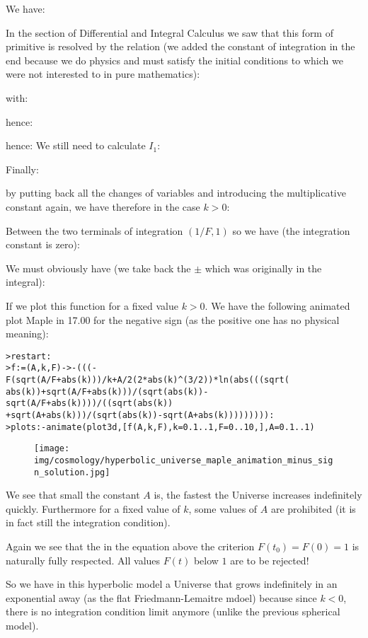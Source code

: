 	We have:
	
	In the section of Differential and Integral Calculus we saw that this form of primitive is resolved by the relation (we added the constant of integration in the end because we do physics and must satisfy the initial conditions to which we were not interested to in pure mathematics):
		
	with:
	
	hence:
	
	hence:
	We still need to calculate $I_1$:
	
	Finally:
	
	by putting back all the changes of variables and introducing the multiplicative constant again, we have therefore in the case $k>0$:
	
	Between the two terminals of integration $(1/F,1)$ so we have (the integration constant is zero):
	
	We must obviously have (we take back the $\pm$ which was originally in the integral):
	
	If we plot this function for a fixed value $k>0$. We have the following  animated plot Maple in 17.00 for the negative sign (as the positive one has no physical meaning):
	
	\texttt{>restart:\\
	>f:=(A,k,F)->-(((-F(sqrt(A/F+abs(k)))/k+A/2(2*abs(k)\string^(3/2))*ln(abs(((sqrt(\\
	abs(k))+sqrt(A/F+abs(k)))/(sqrt(abs(k))-sqrt(A/F+abs(k))))/((sqrt(abs(k))\\
	+sqrt(A+abs(k)))/(sqrt(abs(k))-sqrt(A+abs(k))))))))):\\
	>plots:-animate(plot3d,[f(A,k,F),k=0.1..1,F=0..10,],A=0.1..1)
	}
	\begin{figure}[H]
		\begin{center}
		\texttt{[image: img/cosmology/hyperbolic\_universe\_maple\_animation\_minus\_sign\_solution.jpg]}
		\end{center}
	\end{figure}
	We see that small the constant $A$ is, the fastest the Universe increases indefinitely quickly. Furthermore for a fixed value of $k$, some values of $A$ are prohibited (it is in fact still the integration condition).

	Again we see that the in the equation above the criterion $F(t_0)=F(0)=1$ is naturally fully respected. All values $F (t) $ below $1$ are to be rejected!

	So we have in this hyperbolic model a Universe that grows indefinitely in an exponential away (as the flat Friedmann-Lemaitre mdoel) because since $k<0$, there is no integration condition limit anymore (unlike the previous spherical model).
	
